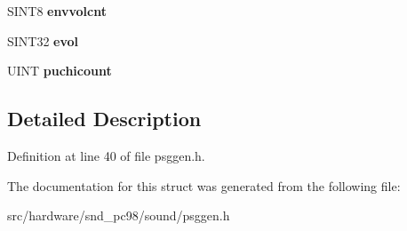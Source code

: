 \begin{DoxyCompactItemize}
\item 
\hypertarget{struct__PSGGEN_a38419e8ed312023e8d630b4a06f094da}{S\-I\-N\-T8 {\bfseries envvolcnt}}\label{struct__PSGGEN_a38419e8ed312023e8d630b4a06f094da}

\item 
\hypertarget{struct__PSGGEN_a1bbb6d7af11d1bf1e89c8c3abab69cad}{S\-I\-N\-T32 {\bfseries evol}}\label{struct__PSGGEN_a1bbb6d7af11d1bf1e89c8c3abab69cad}

\item 
\hypertarget{struct__PSGGEN_a3493079bd0e64475e2503d32ce884598}{U\-I\-N\-T {\bfseries puchicount}}\label{struct__PSGGEN_a3493079bd0e64475e2503d32ce884598}

\end{DoxyCompactItemize}


\subsection{Detailed Description}


Definition at line 40 of file psggen.\-h.



The documentation for this struct was generated from the following file\-:\begin{DoxyCompactItemize}
\item 
src/hardware/snd\-\_\-pc98/sound/psggen.\-h\end{DoxyCompactItemize}
